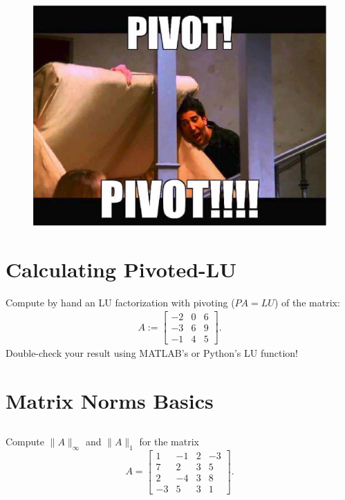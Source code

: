 \documentclass[11pt,letterpaper]{report}
\begin{document}
\begin{figure}[H]
    \centering
    \includegraphics[scale = 0.7]{Session_3/latex/figs/pivot_pivot}
\end{figure}



\section{Calculating Pivoted-LU}
Compute by hand an LU factorization with pivoting ($PA = LU$) of the matrix:
\begin{align*}
A:=
  \begin{bmatrix}
    -2  &   0   &   6\\
    -3  &   6   &   9\\
    -1 &    4   &   5
  \end{bmatrix}.
\end{align*}
Double-check your result using MATLAB's or Python's LU function!

\section{Matrix Norms Basics}
\subsection{}
Compute $\|A\|_\infty$ and $\|A\|_1$ for the matrix
\[
A = \begin{bmatrix}
1 & -1  &2 & -3 \\ 7 & 2 & 3 & 5 \\ 2 & -4 & 3 & 8 \\ -3 & 5 & 3 & 1
\end{bmatrix}.
\]
\end{document}

